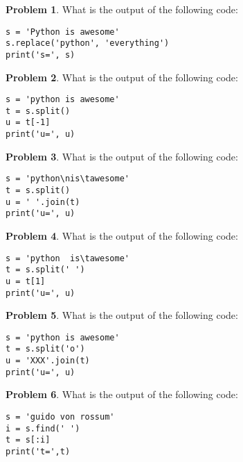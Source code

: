 \documentclass[10pt]{article}
\theoremstyle{definition}
\newtheorem{problem}{Problem}
\begin{document}
\begin{problem}
    What is the output of the following code:
\end{problem}
\begin{lstlisting}
s = 'Python is awesome'
s.replace('python', 'everything')
print('s=', s)
\end{lstlisting}
\vspace{1.5in}

\begin{problem}
    What is the output of the following code:
\end{problem}
\begin{lstlisting}
s = 'python is awesome'
t = s.split()
u = t[-1]
print('u=', u)
\end{lstlisting}
\vspace{1.5in}

\begin{problem}
    What is the output of the following code:
\end{problem}
\begin{lstlisting}
s = 'python\nis\tawesome'
t = s.split()
u = ' '.join(t)
print('u=', u)
\end{lstlisting}
\vspace{1.5in}

\begin{problem}
    What is the output of the following code:
\end{problem}
\begin{lstlisting}
s = 'python  is\tawesome'
t = s.split(' ')
u = t[1]
print('u=', u)
\end{lstlisting}
\vspace{1.5in}

\begin{problem}
    What is the output of the following code:
\end{problem}
\begin{lstlisting}
s = 'python is awesome'
t = s.split('o')
u = 'XXX'.join(t)
print('u=', u)
\end{lstlisting}
\vspace{1.5in}

\begin{problem}
    What is the output of the following code:
\end{problem}
\begin{lstlisting}
s = 'guido von rossum'
i = s.find(' ')
t = s[:i]
print('t=',t)
\end{lstlisting}
\vspace{1.5in}
\end{document}
